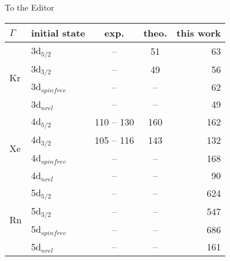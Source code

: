 \documentclass[DIN,pagenumber=false,parskip=half,fromalign=left,fromphone=true,fromemail=true,fromurl=false,fromlogo=false,fromrule=false]{scrlttr2}
\begin{document}
\begin{letter}{To the Editor}
\begin{enumerate}
\begin{enumerate}
{{          \begin{tabular}{llccr}                                            
           \toprule                                                         
            $\Gamma$            & initial state   &    exp.    & theo.& this work\\       
           \midrule                                                         
            \multirow{4}{*}{Kr} & 3d$_{5/2}$      &     --     &  51  & 63\\
                                & 3d$_{3/2}$      &     --     &  49  & 56\\
                                & 3d$_{spinfree}$ &     --     &  --  & 62\\
                                & 3d$_{nrel}$     &     --     &  --  & 49\\
           \midrule                                                         
            \multirow{4}{*}{Xe} & 4d$_{5/2}$      & 110 -- 130 & 160  & 162\\
                                & 4d$_{3/2}$      & 105 -- 116 & 143  & 132\\
                                & 4d$_{spinfree}$ &     --     &  --  & 168\\
                                & 4d$_{nrel}$     &     --     &  --  & 90\\
           \midrule                                                         
            \multirow{4}{*}{Rn} & 5d$_{5/2}$      &     --     &  --  & 624\\
                                & 5d$_{3/2}$      &     --     &  --  & 547\\
                                & 5d$_{spinfree}$ &     --     &  --  & 686\\
                                & 5d$_{nrel}$     &     --     &  --  & 161\\
           \bottomrule                                                      
          \end{tabular}                                                     

}}
\end{enumerate}
\end{enumerate}
\end{letter}
\end{document}
